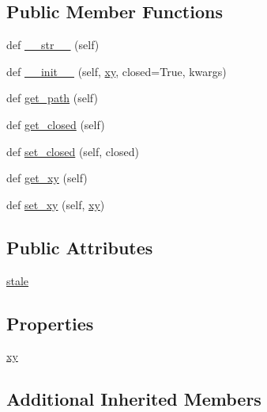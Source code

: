 \subsection*{Public Member Functions}
\begin{DoxyCompactItemize}
\item 
def \hyperlink{classmatplotlib_1_1patches_1_1Polygon_a2a696d9b36eea8c40e50f1f547aebbc2}{\+\_\+\+\_\+str\+\_\+\+\_\+} (self)
\item 
def \hyperlink{classmatplotlib_1_1patches_1_1Polygon_a416ad7c42def4174e7a7ecca4430ed07}{\+\_\+\+\_\+init\+\_\+\+\_\+} (self, \hyperlink{classmatplotlib_1_1patches_1_1Polygon_adbcd8cb98f296fee4f52ba638b92e2e1}{xy}, closed=True, kwargs)
\item 
def \hyperlink{classmatplotlib_1_1patches_1_1Polygon_a13bbb4cf541c7a332b5eb5f616d0818c}{get\+\_\+path} (self)
\item 
def \hyperlink{classmatplotlib_1_1patches_1_1Polygon_a30ac35698d373fb21662b2052b3b4b23}{get\+\_\+closed} (self)
\item 
def \hyperlink{classmatplotlib_1_1patches_1_1Polygon_a776170097e742cb707c80dc474b473f8}{set\+\_\+closed} (self, closed)
\item 
def \hyperlink{classmatplotlib_1_1patches_1_1Polygon_ac0b634fd990a21c4855236fefe707c89}{get\+\_\+xy} (self)
\item 
def \hyperlink{classmatplotlib_1_1patches_1_1Polygon_a1867a3388b4e3553e86de19874dd466e}{set\+\_\+xy} (self, \hyperlink{classmatplotlib_1_1patches_1_1Polygon_adbcd8cb98f296fee4f52ba638b92e2e1}{xy})
\end{DoxyCompactItemize}
\subsection*{Public Attributes}
\begin{DoxyCompactItemize}
\item 
\hyperlink{classmatplotlib_1_1patches_1_1Polygon_aae8022e6188d979d34a6b83d1c97febf}{stale}
\end{DoxyCompactItemize}
\subsection*{Properties}
\begin{DoxyCompactItemize}
\item 
\hyperlink{classmatplotlib_1_1patches_1_1Polygon_adbcd8cb98f296fee4f52ba638b92e2e1}{xy}
\end{DoxyCompactItemize}
\subsection*{Additional Inherited Members}


